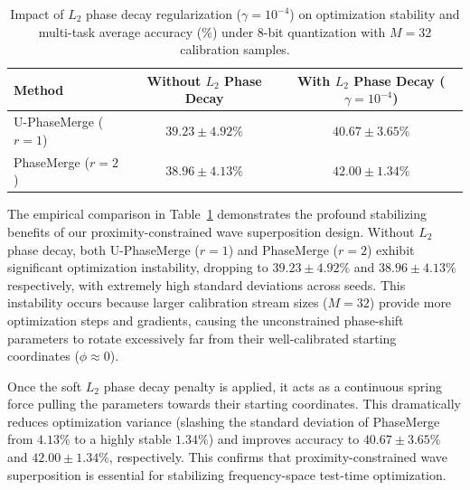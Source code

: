 \documentclass{article}
\theoremstyle{plain}
\theoremstyle{definition}
\theoremstyle{remark}
\begin{document}
\begin{table}[ht]
\caption{Impact of $L_2$ phase decay regularization ($\gamma = 10^{-4}$) on optimization stability and multi-task average accuracy (\%) under 8-bit quantization with $M=32$ calibration samples.}
\label{tab:l2_ablation}
\vskip 0.15in
\begin{center}
\begin{small}
\begin{sc}
\begin{tabular}{lcc}
\toprule
Method & Without $L_2$ Phase Decay & With $L_2$ Phase Decay ($\gamma = 10^{-4}$) \\
\midrule
U-PhaseMerge ($r=1$) & $39.23 \pm 4.92\%$ & $\mathbf{40.67 \pm 3.65\%}$ \\
PhaseMerge ($r=2$) & $38.96 \pm 4.13\%$ & $\mathbf{42.00 \pm 1.34\%}$ \\
\bottomrule
\end{tabular}
\end{sc}
\end{small}
\end{center}
\vskip -0.1in
\end{table}

The empirical comparison in Table~\ref{tab:l2_ablation} demonstrates the profound stabilizing benefits of our proximity-constrained wave superposition design. Without $L_2$ phase decay, both U-PhaseMerge ($r=1$) and PhaseMerge ($r=2$) exhibit significant optimization instability, dropping to $39.23 \pm 4.92\%$ and $38.96 \pm 4.13\%$ respectively, with extremely high standard deviations across seeds. This instability occurs because larger calibration stream sizes ($M=32$) provide more optimization steps and gradients, causing the unconstrained phase-shift parameters to rotate excessively far from their well-calibrated starting coordinates ($\phi \approx 0$). 

Once the soft $L_2$ phase decay penalty is applied, it acts as a continuous spring force pulling the parameters towards their starting coordinates. This dramatically reduces optimization variance (slashing the standard deviation of PhaseMerge from $4.13\%$ to a highly stable $1.34\%$) and improves accuracy to $40.67 \pm 3.65\%$ and $42.00 \pm 1.34\%$, respectively. This confirms that proximity-constrained wave superposition is essential for stabilizing frequency-space test-time optimization.
\end{document}
